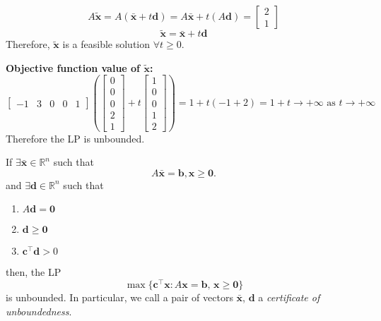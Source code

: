 \begin{exbox}
\begin{example}[Unbounded LP]
        \[A\tilde{\bm{x}}=A(\bar{\bm{x}}+t\bm{d})=A\bar{\bm{x}}+t(A\bm{d})=
            \begin{bmatrix}
                2 \\
                1
            \end{bmatrix}\]
        \[\tilde{\bm{x}}=\bar{\bm{x}}+t\bm{d}\]
        Therefore, $\tilde{\bm{x}}$ is a feasible solution $\forall t\geqslant  0$.


        \textbf{Objective function value of $\tilde{\bm{x}}$:}
        \[
            \begin{bmatrix}
                -1 & 3 & 0 & 0 & 1
            \end{bmatrix}
            \left(\begin{bmatrix}
                    0 \\
                    0 \\
                    0 \\
                    2 \\
                    1
                \end{bmatrix}
            +
            t
            \begin{bmatrix}
                    1 \\
                    0 \\
                    0 \\
                    1 \\
                    2
                \end{bmatrix}\right)
            =
            1+t(-1+2)=1+t\rightarrow+\infty \text{ as }t\rightarrow+\infty\]
        Therefore the LP is unbounded.
    \end{example}
\end{exbox}

\begin{thmbox}
    \begin{theorem}
        If $\exists \bm{\bar{x}}\in\mathbb{R}^n$ such that
        \[A\bm{\bar{x}}=\bm{b}, \bm{x}\geqslant  \bm{0}.\]
        and $\exists\bm{d}\in\mathbb{R}^n$ such that
        \begin{enumerate}[label=(\arabic*)]
            \item $A\bm{d}=\bm{0}$
            \item $\bm{d}\geqslant  \bm{0}$
            \item $\bm{c}^\top \bm{d}>0$
        \end{enumerate}
        then, the LP
        \[\max \{\bm{c}^\top \bm{x} : A\bm{x}=\bm{b},\,
            \bm{x}\geqslant \bm{0}\}\]
        is unbounded. In particular, we call a pair of vectors $\bm{\bar{x}}$, $\bm{d}$ a
        \emph{certificate of unboundedness}.
    \end{theorem}
\end{thmbox}


